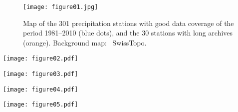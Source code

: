 \documentclass[smallextended]{svjour3}       %
\begin{document}
	
	
	

	
	\begin{figure}
		\texttt{[image: figure01.jpg]}\\
		\caption{Map of the 301 precipitation stations with good data coverage of the period 1981--2010 (blue dots), and the 30 stations with long archives (orange). Background map: \textcopyright\ SwissTopo.}
		\label{fig:stations}
	\end{figure}
	
	\begin{figure*}
		\texttt{[image: figure02.pdf]}\\
		\caption{CRPSS scores for all stations, and for all considered AMs and reanalysis datasets on the VP. A higher CRPSS score means better performance. The parameters of the AMs were calibrated for every station, every dataset, and every method. The boxes show the 25th, 50th, and 75th percentiles. The whiskers extend to the most extreme data point which is no more than 1.5 times the interquartile range.}
		\label{fig:comparison_values}
	\end{figure*}
	
	\begin{figure*}
		\texttt{[image: figure03.pdf]}\\
		\caption{Impact of the reanalysis dataset on performance, isolated by processing the improvement in CRPSS for one dataset compared to the mean performance on all datasets, per station and per method. Note that the methods cannot be compared here, only the datasets. Same conventions as Fig. \ref{fig:comparison_values}.}
		\label{fig:comparison_relative}
	\end{figure*}
	
	\begin{figure*}
		\texttt{[image: figure04.pdf]}\\
		\caption{Inter-annual correlation between the mean precipitation from the selected analogues and the observations for all stations and for all considered AMs and reanalysis datasets on both the CP and the VP. Same conventions as Fig. \ref{fig:comparison_values}.}
		\label{fig:correlation}
	\end{figure*}
	
	\begin{figure*}
		\texttt{[image: figure05.pdf]}\\
		\caption{Same as Fig. \ref{fig:correlation}, but for relative biases.}
		\label{fig:biases}
	\end{figure*}
	
\end{document}
